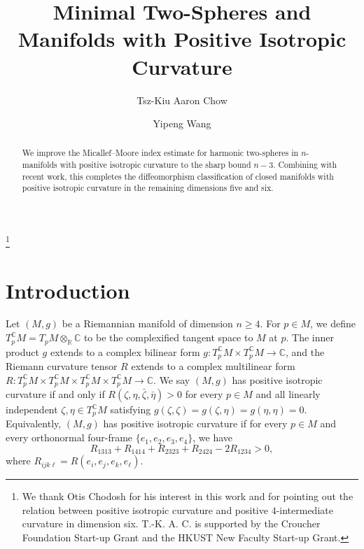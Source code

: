 \documentclass[11pt]{amsart}
\theoremstyle{definition}
\begin{document}
\title[Minimal Two-Spheres]{Minimal Two-Spheres and Manifolds with Positive Isotropic Curvature}

\author{Tsz-Kiu Aaron Chow}
\address{Department of Mathematics, Hong Kong University of Science and Technology, Hong Kong S.A.R., China}

\author{Yipeng Wang}
\address{Department of Mathematics, Princeton University, Princeton, NJ 08544, USA}

\thanks{We thank Otis Chodosh for his interest in this work and for pointing out the relation between positive isotropic curvature and positive \(4\)-intermediate curvature in dimension six. T.-K. A. C. is supported  by the Croucher Foundation Start-up Grant and the HKUST New Faculty Start-up Grant.}

\begin{abstract}
We improve the Micallef--Moore index estimate for harmonic two-spheres in $n$-manifolds with positive isotropic curvature to the sharp bound $n-3$. Combining with recent work, this completes the diffeomorphism classification of closed manifolds with positive isotropic curvature in the remaining dimensions five and six.
\end{abstract}

\maketitle

\section{Introduction}
Let $(M,g)$ be a Riemannian manifold of dimension $n\geq 4$. For $p\in M$, we define $T_p^{\mathbb{C}}M=T_pM\otimes _{\mathbb{R}}\mathbb{C}$ to be the complexified tangent space to $M$ at $p$. The inner product $g$ extends to a complex bilinear form $g:T_p^{\mathbb{C}}M\times T_p^{\mathbb{C}}M\to \mathbb{C}$, and the Riemann curvature tensor $R$ extends to a complex multilinear form $R:T_p^{\mathbb{C}}M\times T_p^{\mathbb{C}}M\times T_p^{\mathbb{C}}M\times T_p^{\mathbb{C}}M\to \mathbb{C}$. We say $(M,g)$ has positive isotropic curvature if and only if $R(\zeta,\eta,\bar\zeta,\bar\eta)>0$ for every $p\in M$ and all linearly independent $\zeta,\eta\in T_p^{\mathbb C}M$ satisfying $g(\zeta,\zeta)=g(\zeta,\eta)=g(\eta,\eta)=0$. Equivalently, $(M,g)$ has positive isotropic curvature if for every $p\in M$ and every orthonormal four-frame $\{e_1,e_2,e_3,e_4\}$, we have
\[
R_{1313}+R_{1414}+R_{2323}+R_{2424}-2R_{1234}>0,
\]
where $R_{ijk\ell}=R(e_i,e_j,e_k,e_{\ell})$.
\end{document}
